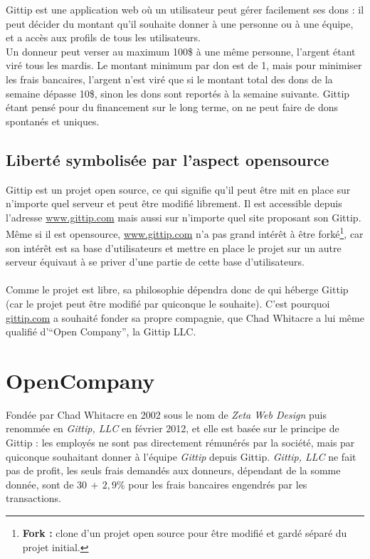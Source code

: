 Gittip est une application web où un utilisateur peut gérer
facilement ses dons : il peut décider du montant qu'il souhaite donner à une
personne ou à une équipe, et a accès aux profils de tous les utilisateurs.\\ Un
donneur peut verser au maximum 100\${} à une même personne, l'argent étant viré
tous les mardis. Le montant minimum par don est de 1\textcent, mais pour
minimiser les frais bancaires, l'argent n'est viré que si le montant total des
dons de la semaine dépasse 10\${}, sinon les dons sont reportés à la semaine
suivante.  Gittip étant pensé pour du financement sur le long terme, on ne peut
faire de dons spontanés et uniques.

    \subsection{Liberté symbolisée par l'aspect opensource}

Gittip est un projet open source, ce qui signifie qu'il peut être
mit en place sur n'importe quel serveur et peut être modifié librement.
Il est accessible depuis l'adresse \url{www.gittip.com} mais aussi sur
n'importe quel site proposant son Gittip. Même si il est opensource,
\url{www.gittip.com} n'a pas grand intérêt à être forké\footnote{\textbf{Fork
:} clone d'un projet open source pour être modifié et gardé séparé du
projet initial.}, car son intérêt est sa base d'utilisateurs et mettre en place
le projet sur un autre serveur équivaut à se priver d'une partie de cette base
d'utilisateurs.

\paragraph{}
Comme le projet est libre, sa philosophie dépendra donc de qui héberge Gittip
(car le projet peut être modifié par quiconque le souhaite). C'est pourquoi
\url{gittip.com} a souhaité fonder sa propre compagnie, que Chad Whitacre a lui
même qualifié d'``Open Company'', la Gittip LLC.


    \section{OpenCompany}

Fondée par Chad Whitacre en 2002 sous le nom de \emph{Zeta Web Design} puis
renommée en \emph{Gittip, LLC} en février 2012, et elle est basée sur le
principe de Gittip : les employés ne sont pas directement rémunérés par la
société, mais par quiconque souhaitant donner à l'équipe \emph{Gittip} depuis
Gittip. \emph{Gittip, LLC} ne fait pas de profit, les seuls frais demandés aux
donneurs, dépendant de la somme donnée, sont de $30$\textcent $\, + \, 2,9\%{}$
pour les frais bancaires engendrés par les transactions.

